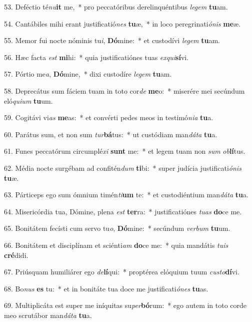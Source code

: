 53. Deféctio té\textit{nu}\textbf{it} me,~*  pro peccatóribus derelinquéntibus \textit{le}\textit{gem} \textbf{tu}am.\

54. Cantábiles mihi erant justificatió\textit{nes} \textbf{tu}æ,~*  in loco peregrinati\textit{ó}\textit{nis} \textbf{me}æ.\

55. Memor fui nocte nóminis tu\textit{i}, \textbf{Dó}mine:~*  et custodívi \textit{le}\textit{gem} \textbf{tu}am.\

56. Hæc facta \textit{est} \textbf{mi}hi:~*  quia justificatiónes tuas \textit{ex}\textit{qui}\textbf{sí}vi.\

57. Pórtio me\textit{a}, \textbf{Dó}mine,~*  dixi custodíre \textit{le}\textit{gem} \textbf{tu}am.\

58. Deprecátus sum fáciem tuam in toto cor\textit{de} \textbf{me}o:~*  miserére mei secúndum eló\textit{qui}\textit{um} \textbf{tu}um.\

59. Cogitávi vi\textit{as} \textbf{me}as:~*  et convérti pedes meos in testimó\textit{ni}\textit{a} \textbf{tu}a.\

60. Parátus sum, et non sum \textit{tur}\textbf{bá}tus:~*  ut custódiam man\textit{dá}\textit{ta} \textbf{tu}a.\

61. Funes peccatórum circumplé\textit{xi} \textbf{sunt} me:~*  et legem tuam non \textit{sum} \textit{ob}\textbf{lí}tus.\

62. Média nocte surgébam ad confitén\textit{dum} \textbf{ti}bi:~*  super judícia justificati\textit{ó}\textit{nis} \textbf{tu}æ.\

63. Párticeps ego sum ómnium timén\textit{ti}\textbf{um} te:~*  et custodiéntium man\textit{dá}\textit{ta} \textbf{tu}a.\

64. Misericórdia tua, Dómine, plena \textit{est} \textbf{ter}ra:~*  justificatiónes \textit{tu}\textit{as} \textbf{do}ce me.\

65. Bonitátem fecísti cum servo tu\textit{o}, \textbf{Dó}mine:~*  secúndum \textit{ver}\textit{bum} \textbf{tu}um.\

66. Bonitátem et disciplínam et sciénti\textit{am} \textbf{do}ce me:~*  quia mandátis \textit{tu}\textit{is} \textbf{cré}didi.\

67. Priúsquam humiliárer ego \textit{de}\textbf{lí}qui:~*  proptérea elóquium tuum \textit{cus}\textit{to}\textbf{dí}vi.\

68. Bo\textit{nus} \textbf{es} tu:~*  et in bonitáte tua doce me justificati\textit{ó}\textit{nes} \textbf{tu}as.\

69. Multiplicáta est super me iníquitas su\textit{per}\textbf{bó}rum:~*  ego autem in toto corde meo scrutábor man\textit{dá}\textit{ta} \textbf{tu}a.\

